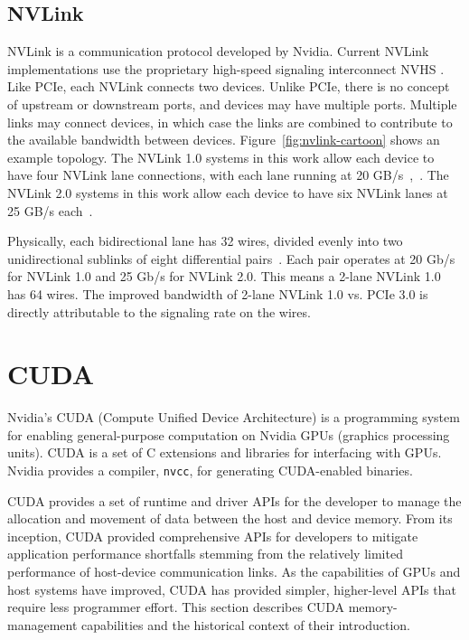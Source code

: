 \subsection{NVLink}

NVLink is a communication protocol developed by Nvidia.
Current NVLink implementations use the proprietary high-speed signaling interconnect NVHS \cite{harris2016insidepascal}.
Like PCIe, each NVLink connects two devices.
Unlike PCIe, there is no concept of upstream or downstream ports, and devices may have multiple ports.
Multiple links may connect devices, in which case the links are combined to contribute to the available bandwidth between devices.
Figure~\ref{fig:nvlink-cartoon} shows an example topology.
The NVLink 1.0 systems in this work allow each device to have four NVLink lane connections, with each lane running at 20 GB/s~\cite{nvidia2017dgx1},~\cite{nvidia2016p100}.
The NVLink 2.0 systems in this work allow each device to have six NVLink lanes at 25 GB/s each~\cite{nvidia2017v100}.

Physically, each bidirectional lane has 32 wires, divided evenly into two unidirectional sublinks of eight differential pairs~\cite{harris2016insidepascal}.
Each pair operates at 20 Gb/s for NVLink 1.0 and 25 Gb/s for NVLink 2.0.
This means a 2-lane NVLink 1.0 has 64 wires.
The improved bandwidth of 2-lane NVLink 1.0 vs. PCIe 3.0 is directly attributable to the signaling rate on the wires.

\section{CUDA}
\label{sec:cuda}

Nvidia's CUDA (Compute Unified Device Architecture) is a programming system for enabling general-purpose computation on Nvidia GPUs (graphics processing units).
CUDA is a set of C extensions and libraries for interfacing with GPUs.
Nvidia provides a compiler, \texttt{nvcc}, for generating CUDA-enabled binaries.

CUDA provides a set of runtime and driver APIs for the developer to manage the allocation and movement of data between the host and device memory.
From its inception, CUDA provided comprehensive APIs for developers to mitigate application performance shortfalls stemming from the relatively limited performance of host-device communication links.
As the capabilities of GPUs and host systems have improved, CUDA has provided simpler, higher-level APIs that require less programmer effort.
This section describes CUDA memory-management capabilities and the historical context of their introduction.

